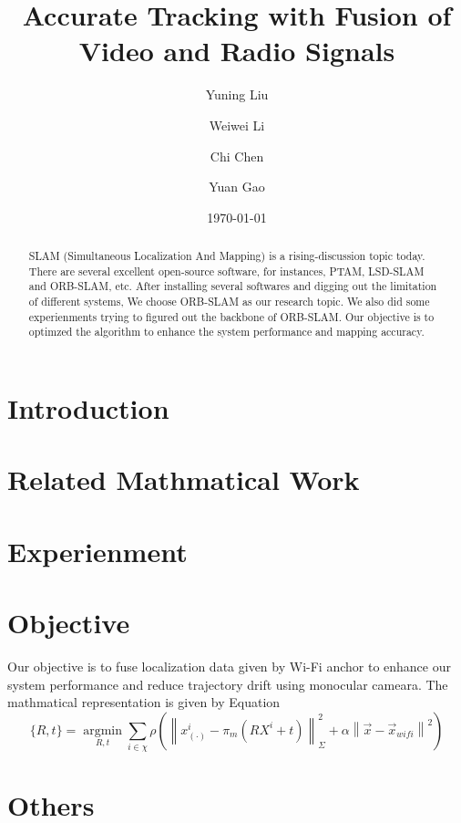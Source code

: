 \documentclass[twocolumn]{article}
\title{Accurate Tracking with Fusion of Video and Radio Signals}
\author{Yuning Liu}
\author{Weiwei Li}
\author{Chi Chen}
\author{Yuan Gao}
\affil{University of New South Wales}
\date{\today}
\begin{document}
\maketitle
\begin{abstract}
     SLAM (Simultaneous Localization And Mapping) is a rising-discussion topic today. There are several excellent open-source software, for instances, PTAM, LSD-SLAM and ORB-SLAM, etc. After installing several softwares and digging out the limitation of different systems, We choose ORB-SLAM as our research topic. We also did some experienments trying to figured out the backbone of ORB-SLAM. Our objective is to optimzed the algorithm to enhance the system performance and mapping accuracy.
\end{abstract}

\section{Introduction}

\section{Related Mathmatical Work}


\section{Experienment}

\section{Objective}

Our objective is to fuse localization data given by Wi-Fi anchor to enhance our system performance and reduce trajectory drift using monocular cameara. The mathmatical representation is given by Equation \label{wifi math}
\begin{equation}
    \{R, t\} = \operatorname*{argmin}_{R, t} \sum_{i\in \chi} \rho(\left\|x^i_{(\cdot)}-\pi_{m}(RX^i+t)\right\|^2_\Sigma+\alpha\left\|\vec{x}-\vec{x}_{wifi}\right\|^2) \label{wifi math}
\end{equation}

\section{Others}
\end{document}

